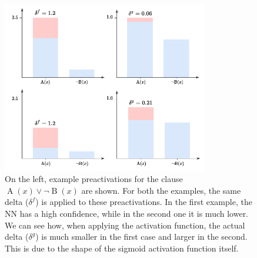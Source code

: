 \begin{figure}[h!]
	\centering
	\includegraphics[width=0.8\textwidth]{figures/preac_deltas_example.pdf}
	\caption{On the left, example preactivations for the clause $\operatorname{A}(x) \vee \neg \operatorname{B}(x)$ are shown. For both the examples, the same delta ($\delta^f$) is applied to these preactivations. In the first example, the NN has a high confidence, while in the second one it is much lower. We can see how, when applying the activation function, the actual delta ($\delta^g$) is much smaller in the first case and larger in the second. This is due to the shape of the sigmoid activation function itself.  }
	\label{fig:preacs_deltas_example}
\end{figure}

